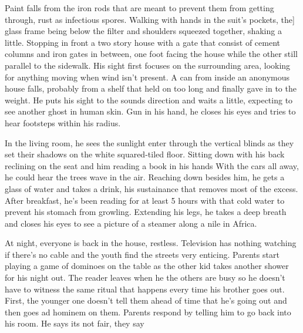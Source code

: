 \begin{Document}
       Paint falls from the iron rods that are meant to prevent them from getting through, rust as infectious spores. Walking with hands in the suit's pockets, the]
    glass frame being below the filter and shoulders squeezed together, shaking a little. Stopping in front a two story house with a gate that consist of cement
    columns and iron gates in between, one foot facing the house while the other still parallel to the sidewalk. His sight first focuses on the surrounding area,
    looking for anything moving when wind isn't present. A can from inside an anonymous house falls, probably from a shelf that held on too long and finally
    gave in to the weight. He puts his sight to the sounds direction and waits a little, expecting to see another ghost in human skin. Gun in his hand, he closes
    his eyes and tries to hear footsteps within his radius.

       In the living room, he sees the sunlight enter through the vertical blinds as they set their shadows on the white squared-tiled floor. Sitting down with his
    back reclining on the seat and him reading a book in his hands  With the cars all away, he could hear the trees wave in the air. Reaching down besides him,
    he gets a glass of water and takes a drink, his sustainance that removes most of the excess. After breakfast, he's been reading for at least 5 hours with
    that cold water to prevent his stomach from growling. Extending his legs, he takes a deep breath and closes his eyes to see a picture of a steamer along
    a nile in Africa.

        At night, everyone is back in the house, restless. Television has nothing watching if there's no cable and the youth find the streets very enticing. 
    Parents start playing a game of dominoes on the table as the other kid takes another shower for his night out. The reader leaves when he the others are
    busy so he doesn't have to witness the same ritual that happens every time his brother goes out. First, the younger one doesn't tell them ahead of time that
    he's going out and then goes ad hominem on them. Parents respond by telling him to go back into his room. He says its not fair, they say
\end{Document}
